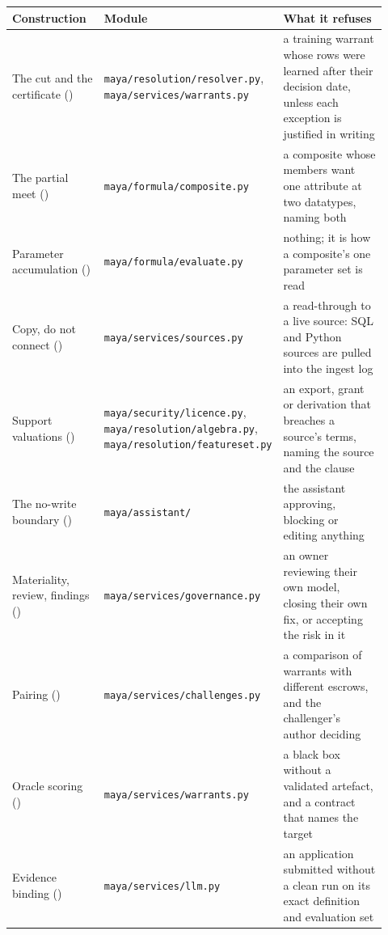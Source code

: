 \documentclass[11pt,a4paper]{article}
\renewcommand{\_}{\oldunderscore\allowbreak}
\theoremstyle{plain}
\theoremstyle{definition}
\theoremstyle{definition}
\theoremstyle{remark}
\begin{document}
\begin{center}
\small
\begin{longtable}{@{}L{0.25\linewidth}L{0.37\linewidth}L{0.30\linewidth}@{}}
\toprule
\textbf{Construction} & \textbf{Module} & \textbf{What it refuses} \\
\midrule
\endhead
The cut and the certificate () & \texttt{maya/resolution/resolver.py},
\texttt{maya/services/warrants.py} & a training warrant whose rows were learned after their decision date,
unless each exception is justified in writing \\
The partial meet () & \texttt{maya/formula/composite.py} & a composite whose members
want one attribute at two datatypes, naming both \\
Parameter accumulation () & \texttt{maya/formula/evaluate.py} & nothing; it is how a
composite's one parameter set is read \\
Copy, do not connect () & \texttt{maya/services/sources.py} & a read-through to a live
source: SQL and Python sources are pulled into the ingest log \\
Support valuations () & \texttt{maya/security/licence.py},
\texttt{maya/resolution/algebra.py}, \texttt{maya/resolution/featureset.py} & an export, grant or
derivation that breaches a source's terms, naming the source and the clause \\
The no-write boundary () & \texttt{maya/assistant/} & the assistant approving,
blocking or editing anything \\
Materiality, review, findings () & \texttt{maya/services/governance.py} & an owner
reviewing their own model, closing their own fix, or accepting the risk in it \\
Pairing () & \texttt{maya/services/challenges.py} & a comparison of warrants with
different escrows, and the challenger's author deciding \\
Oracle scoring () & \texttt{maya/services/warrants.py} & a black box without a
validated artefact, and a contract that names the target \\
Evidence binding () & \texttt{maya/services/llm.py} & an application submitted
without a clean run on its exact definition and evaluation set \\
\bottomrule
\end{longtable}
\end{center}
\end{document}
